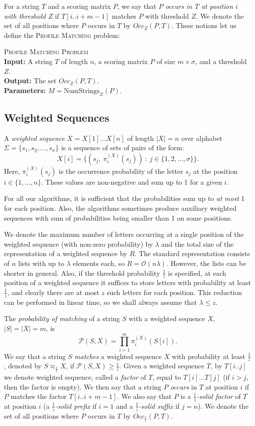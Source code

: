 \documentclass{article}
\theoremstyle{plain}
\theoremstyle{definition}
\newenvironment{dsproblem}[1]
{\begin{center}\begin{lrbox}{\mybox}\begin{minipage}{0.96\columnwidth}#1 \textsc{Problem}\\}
{\end{minipage}\end{lrbox}\fbox{\usebox{\mybox}}\end{center}}
\newcommand{\defdsproblemoutpar}[4]{
  \begin{dsproblem}{#1}
\textbf{Input:} #2\\
\textbf{Output:} #3\\
\textbf{Parameters:} #4
  \end{dsproblem}
  }
\newcommand{\PM}{\textsc{Profile Matching}\xspace}
\newcommand{\Oh}{\mathcal{O}}
\newcommand{\Occ}{\mathit{Occ}}
\renewcommand{\P}{\mathcal{P}}
\newcommand{\fr}{\ensuremath{\frac1z}}
\newcommand{\match}{\approx_{\frac1z}}
\newcommand{\NumStrings}{\mathrm{NumStrings}}
\begin{document}
    For a string $T$ and a scoring matrix $P$, we say that $P$ \emph{occurs in $T$ at position $i$
    with threshold $Z$} if $T[i..i+m-1]$ matches $P$ with threshold $Z$.
    We denote the set of all positions where $P$ occurs in $T$ by $\Occ_Z(P,T)$.
    These notions let us define the \PM problem:

    \defdsproblemoutpar{\PM}{
      A string $T$ of length $n$, a scoring matrix $P$ of size $m \times \sigma$, and
      a threshold $Z$.
    }{
      The set $\Occ_Z(P,T)$.
    }{
      $M = \NumStrings_Z(P)$.
    }

    \subsection{Weighted Sequences}
    A \emph{weighted sequence} $X=X[1] \ldots X[n]$ of length $|X|=n$ over alphabet $\Sigma=\{s_1,s_2,\ldots,s_{\sigma}\}$
    is a sequence of sets of pairs of the form:
    $$X[i] = \{(s_j,\ \pi^{(X)}_i(s_j))\ :\ j \in \{1,2,\ldots,\sigma\}\}.$$
    Here, $\pi_i^{(X)}(s_j)$ is the occurrence probability of the letter $s_j$ at the position $i \in \{1,\ldots,n\}$.
    These values are non-negative and sum up to 1 for a given $i$.
 
    For all our algorithms, it is sufficient that the probabilities sum up to \emph{at most} 1 for each position.
    Also, the algorithms sometimes produce auxiliary weighted sequences with sum of probabilities being smaller than 1 on some positions.

    We denote the maximum number of letters occurring at a single position of the weighted sequence
    (with non-zero probability) by $\lambda$
    and the total size of the representation of a weighted sequence by $R$.
    The standard representation consists of $n$ lists with up to $\lambda$ elements each,
    so $R = \Oh(n \lambda)$.   However, the lists can be shorter in general.
    Also, if the threshold probability $\frac1z$ is specified, at each position of a weighted sequence
    it suffices to store letters with probability at least $\frac1z$, and clearly
    there are at most $z$ such letters for each position. This reduction can be performed in linear time, so we shall always assume
    that $\lambda \le z$.
        


    The \emph{probability of matching} of a string $S$ with a weighted sequence $X$, $|S|=|X|=m$, is 
    $$\P(S,X) = \prod_{i=1}^m \pi^{(X)}_i(S[i]).$$
    We say that a string $S$ \emph{matches} a weighted sequence $X$
    with probability at least \fr, denoted by $S \match X$, if $\P(S,X) \ge \frac1z$.
    Given a weighted sequence $T$, by $T[i..j]$ we denote weighted sequence,
    called a \emph{factor} of $T$, equal to $T[i] \ldots T[j]$ (if $i>j$, then the factor is empty).
    We then say that a string $P$ \emph{occurs} in $T$ at position $i$ if $P$ matches the factor $T[i..i+m-1]$.
    We also say that $P$ is a \emph{\fr-solid factor} of $T$ at position $i$ (a \emph{\fr-solid prefix} if $i=1$
    and a \emph{\fr-solid suffix} if $j=n$).
    We denote the set of all positions where $P$ occurs in $T$ by $\Occ_\fr(P,T)$.
\end{document}

